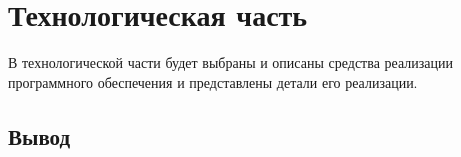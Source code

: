 \chapter{Технологическая часть}
В технологической части будет выбраны и описаны средства реализации программного обеспечения и представлены детали его реализации.
\section*{Вывод}
